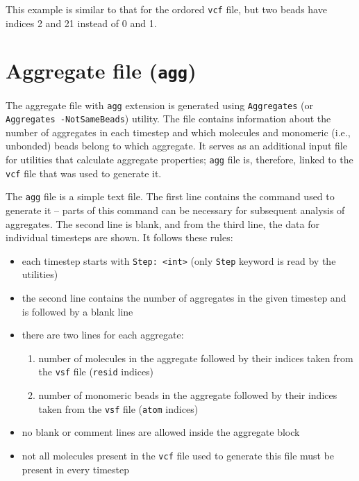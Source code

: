 This example is similar to that for the ordored \texttt{vcf} file, but two
beads have indices 2 and 21 instead of 0 and 1. %

\section{Aggregate file (\texttt{agg})} \label{sec:AggFile} %

The aggregate file with \texttt{agg} extension is generated using
\texttt{Aggregates} (or \texttt{Aggregates -NotSameBeads}) utility. The
file contains information about the number of aggregates in each timestep
and which molecules and monomeric (i.e., unbonded) beads belong to which
aggregate. It serves as an additional input file for utilities that
calculate aggregate properties; \texttt{agg} file is, therefore, linked to
the \texttt{vcf} file that was used to generate it.

The \texttt{agg} file is a simple text file. The first line contains the
command used to generate it -- parts of this command can be necessary for
subsequent analysis of aggregates. The second line is blank, and from the
third line, the data for individual timesteps are shown. It follows these
rules:

\begin{itemize}[topsep=0pt,itemsep=0pt]
  \item each timestep starts with \texttt{Step: <int>} (only \texttt{Step}
    keyword is read by the utilities)
  \item the second line contains the number of aggregates in the given
    timestep and is followed by a blank line
  \item there are two lines for each aggregate:
  \begin{enumerate}[topsep=0pt,itemsep=0pt]
    \item number of molecules in the aggregate followed by their indices
      taken from the \texttt{vsf} file (\texttt{resid} indices)
    \item number of monomeric beads in the aggregate followed by their
      indices taken from the \texttt{vsf} file (\texttt{atom} indices)
  \end{enumerate}
  \item no blank or comment lines are allowed inside the aggregate block
  \item not all molecules present in the \texttt{vcf} file used to generate
    this file must be present in every timestep
\end{itemize}

